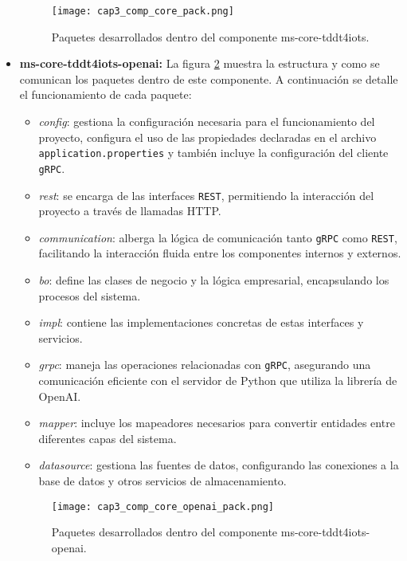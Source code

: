 \begin{itemize}
	
	\begin{figure}[H]
		\centering
		\texttt{[image: cap3\_comp\_core\_pack.png]}
		\caption{Paquetes desarrollados dentro del componente ms-core-tddt4iots.}
		\label{fig:cap3_comp_core_pack}
	\end{figure}
	
	\item \textbf{ms-core-tddt4iots-openai: } La figura \ref{fig:cap3_comp_core_openai_pack} muestra la estructura y como se comunican los paquetes dentro de este componente. A continuación se detalle el funcionamiento de cada paquete:
	
	\begin{itemize}
		\item \textit{config}: gestiona la configuración necesaria para el funcionamiento del proyecto, configura el uso de las propiedades declaradas en el archivo \texttt{application.properties} y también incluye la configuración del cliente \texttt{gRPC}.
		\item \textit{rest}: se encarga de las interfaces \texttt{REST}, permitiendo la interacción del proyecto a través de llamadas HTTP.
		\item \textit{communication}: alberga la lógica de comunicación tanto \texttt{gRPC} como \texttt{REST}, facilitando la interacción fluida entre los componentes internos y externos.
		\item \textit{bo}: define las clases de negocio y la lógica empresarial, encapsulando los procesos del sistema.
		\item \textit{impl}: contiene las implementaciones concretas de estas interfaces y servicios.
		\item \textit{grpc}: maneja las operaciones relacionadas con \texttt{gRPC}, asegurando una comunicación eficiente con el servidor de Python que utiliza la librería de OpenAI.
		\item \textit{mapper}: incluye los mapeadores necesarios para convertir entidades entre diferentes capas del sistema.
		\item \textit{datasource}: gestiona las fuentes de datos, configurando las conexiones a la base de datos y otros servicios de almacenamiento.
	\end{itemize}
	
	\begin{figure}[H]
		\centering
		\texttt{[image: cap3\_comp\_core\_openai\_pack.png]}
		\caption{Paquetes desarrollados dentro del componente ms-core-tddt4iots-openai.}
		\label{fig:cap3_comp_core_openai_pack}
	\end{figure}
	

\end{itemize}
